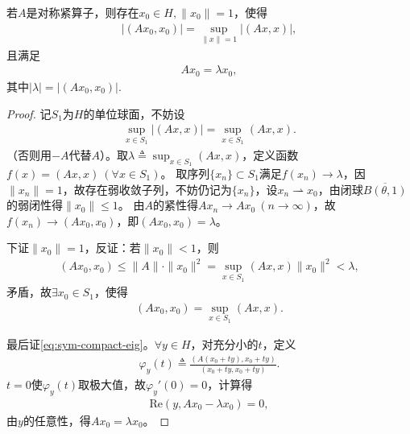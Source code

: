 \documentclass[../../main.tex]{subfiles}%
\begin{document}
\begin{theorem}\label{theorem:对称算子的算子范数等于某个元的内积}
若$A$是对称紧算子，则存在$x_0\in H,\|x_0\|=1$，使得
\begin{align*}
|(Ax_0,x_0)|=\sup_{\|x\|=1}|(Ax,x)|,
\end{align*}
且满足
\begin{align}
Ax_0=\lambda x_0,\label{eq:sym-compact-eig}
\end{align}
其中$|\lambda|=|(Ax_0,x_0)|$.
\end{theorem}
\begin{proof}

记$S_1$为$H$的单位球面，不妨设
\begin{align}
\sup_{x\in S_1}|(Ax,x)|=\sup_{x\in S_1}(Ax,x).\label{eq:sym-compact-sup}
\end{align}
（否则用$-A$代替$A$）。取$\displaystyle\lambda\triangleq\sup_{x\in S_1}(Ax,x)$，定义函数$f(x)=(Ax,x)\ (\forall x\in S_1)$。
取序列$\{x_n\}\subset S_1$满足$f(x_n)\to\lambda$，因$\|x_n\|=1$，故存在弱收敛子列，不妨仍记为$\{x_n\}$，设$x_n\rightharpoonup x_0$，由闭球$\overline{B(\theta,1)}$的弱闭性得$\|x_0\|\leqslant1$。
由$A$的紧性得$Ax_n\to Ax_0\ (n\to\infty)$，故$f(x_n)\to(Ax_0,x_0)$，即$(Ax_0,x_0)=\lambda$。

下证$\|x_0\|=1$，反证：若$\|x_0\|<1$，则
\begin{align*}
(Ax_0,x_0)\leqslant\|A\|\cdot\|x_0\|^2=\sup_{x\in S_1}(Ax,x)\|x_0\|^2<\lambda,
\end{align*}
矛盾，故$\exists x_0\in S_1$，使得
\begin{align*}
(Ax_0,x_0)=\sup_{x\in S_1}(Ax,x).
\end{align*}

最后证\eqref{eq:sym-compact-eig}。$\forall y\in H$，对充分小的$t$，定义
\begin{align*}
\varphi_y(t)\triangleq\frac{(A(x_0+ty),x_0+ty)}{(x_0+ty,x_0+ty)}.
\end{align*}
$t=0$使$\varphi_y(t)$取极大值，故$\varphi_y'(0)=0$，计算得
\begin{align*}
\mathrm{Re}(y,Ax_0-\lambda x_0)=0,
\end{align*}
由$y$的任意性，得$Ax_0=\lambda x_0$。

\end{proof}
\end{document}
